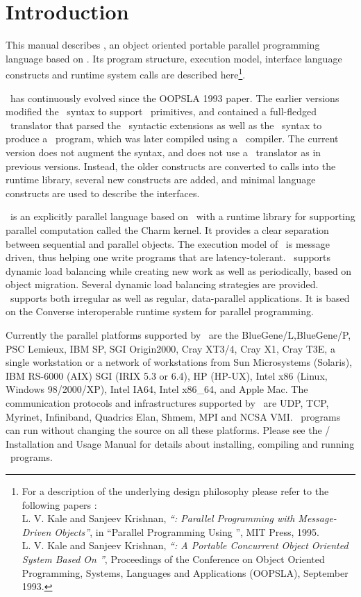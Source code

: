\section{Introduction}

This manual describes \charmpp, an object oriented portable parallel
programming language based on \CC. Its program structure, execution
model, interface language constructs and runtime system calls are
described here\footnote{For a description of the underlying design
philosophy please refer to the following papers :\\
    L. V. Kale and Sanjeev Krishnan,
    {\em ``\charmpp : Parallel Programming with Message-Driven Objects''},
    in ``Parallel Programming Using \CC'',
    MIT Press, 1995. \\
    L. V. Kale and Sanjeev Krishnan,
    {\em ``\charmpp : A Portable Concurrent Object Oriented System
    Based On \CC''},
    Proceedings of the Conference on Object Oriented Programming,
    Systems, Languages and Applications (OOPSLA), September 1993.
}.

\charmpp\ has continuously evolved since the OOPSLA 1993 paper.  The earlier
versions modified the \CC\ syntax to support \charmpp\ primitives, and
contained a full-fledged \charmpp\ translator that parsed the \charmpp\
syntactic extensions as well as the \CC\ syntax to produce a \CC\ program,
which was later compiled using a \CC\ compiler.  The current version does not
augment the \CC{} syntax, and does not use a \charmpp\ translator as in previous
versions. Instead, the older constructs are converted to calls into the runtime
library, several new constructs are added, and minimal language constructs are
used to describe the interfaces.

\charmpp\ is an explicitly parallel language based on \CC\ with a runtime
library for supporting parallel computation called the Charm kernel.  It
provides a clear separation between sequential and parallel objects.  The
execution model of \charmpp\ is message driven, thus helping one write programs
that are latency-tolerant.  \charmpp\ supports dynamic load balancing while
creating new work as well as periodically, based on object migration.  Several
dynamic load balancing strategies are provided.  \charmpp\ supports both
irregular as well as regular, data-parallel applications.  It is based on the
{\sc Converse} interoperable runtime system for parallel programming.

Currently the parallel platforms supported by \charmpp\ are the BlueGene/L,BlueGene/P, PSC
Lemieux, IBM SP, SGI Origin2000, Cray XT3/4, Cray X1, Cray T3E, a single workstation or a
network of workstations from Sun Microsystems (Solaris), IBM RS-6000 (AIX) SGI
(IRIX 5.3 or 6.4), HP (HP-UX), Intel x86 (Linux, Windows 98/2000/XP), Intel
IA64, Intel x86_64, and Apple Mac. The communication protocols and infrastructures supported
by \charmpp\ are UDP, TCP, Myrinet, Infiniband, Quadrics Elan, Shmem, MPI and
NCSA VMI.  \charmpp\ programs can run without changing the source on all these
platforms.  Please see the \charmpp{}/\converse{} Installation and Usage Manual
for details about installing, compiling and running \charmpp\ programs.


